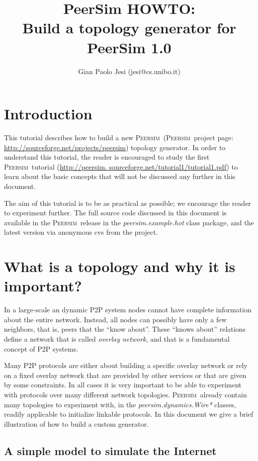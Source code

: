 \documentclass[a4paper,11pt]{article}
\title{PeerSim HOWTO:\\
Build a topology generator for PeerSim 1.0}
\author{Gian Paolo Jesi (jesi@cs.unibo.it)}
\newcommand{\id}[1]{{\scshape\small #1}}
\newcommand{\psim}{\id{Peersim}}
\begin{document}
\maketitle

\section{Introduction}

This tutorial describes how to build a new \psim\ 
(\psim~project page: \url{http://sourceforge.net/projects/peersim})
topology generator. In order to understand this tutorial, the reader
is encouraged to study the first \psim\ tutorial 
(\url{http://peersim. sourceforge.net/tutorial1/tutorial1.pdf}) 
to learn about the basic concepts that will not be discussed any
further in this document. 

The aim of this tutorial is to be as practical as possible;
we encourage the reader to experiment further.
The full source code discussed in this document is available
in the \psim\ release in the \emph{peersim.example.hot} class package,
and the latest version via anonymous cvs from the project.


\section{What is a topology and why it is important?}

In a large-scale an dynamic P2P system nodes cannot have complete
information about the entire network.
Instead, all nodes can possibly have only a few neighbors, that is,
peers that the ``know about''.
These ``knows about'' relations define a network that is called
\emph{overlay network}, and that is a fundamental concept of P2P systems.

Many P2P protocols are either about building a specific overlay network
or rely on a fixed overlay network that are provided by other services
or that are given by some constraints.
In all cases it is very important to be able to experiment with protocols
over many different network topologies.
\psim\ already contain many topologies to experiment with, in the
\emph{peersim.dynamics.Wire*} classes, readily applicable to
initialize linkable protocols.
In this document we give a brief illustration of how to build a custom
generator.


\subsection{A simple model to simulate the Internet}
\label{sec:rule}
\end{document}
